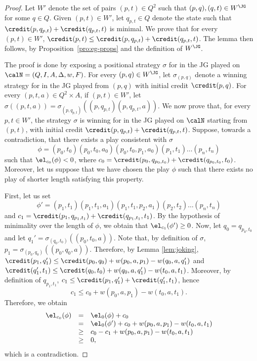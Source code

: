\documentclass[a4paper]{article}
\begin{document}
\begin{proof} 
	Let $W'$ denote the set of pairs $(p,t) \in Q^2$ such that $(p,q),(q,t)
	\in W^{\JG}$ for some $q \in Q$.  Given $(p,t) \in W'$, let $q_{p,t} \in
	Q$ denote the state such that $\credit(p,q_{p,t}) + \credit(q_{p,t},t)$
	is minimal.  We prove that for every $(p,t) \in W'$, $\credit(p,t) \leq
	\credit(p,q_{p,t}) + \credit(q_{p,t},t)$.  The lemma then follows, by
	Proposition~\ref{pro:eg-props} and the definition of $W^{\JG}$.
	
	The proof is done by exposing a positional strategy $\sigma$ for \eve in
	the JG played on $\calN = (Q,I,A,\Delta,w,F)$.
	For every $(p,q) \in W^{\JG}$, let
	$\sigma_{(p,q)}$ denote a winning strategy for \eve in the JG played
	from $(p,q)$ with initial credit $\credit(p,q)$.  For every $(p,t,a) \in
	Q^2 \times A$, if $(p,t) \in W'$, let $\sigma((p,t,a)) =
	\sigma_{(p,q_{p,t})}((p,q_{p,t})(p,q_{p,t},a))$.  We now prove that, for
	every $p,t \in W'$, the strategy $\sigma$ is winning for \eve in the JG
	played on $\calN$ starting from $(p,t)$, with initial credit
	$\credit(p,q_{p,t}) + \credit(q_{p,t},t)$.  Suppose, towards a
	contradiction, that there exists a play consistent with $\sigma$
	\[
		\phi = (p_0, t_0) (p_0, t_0, a_0) (p_0, t_0,p_1, a_0)(p_1,t_1)
		\dots (p_n,t_n)
	\]
	such that $\el_{c_0}(\phi) < 0$, where $c_0 = \credit(p_0,q_{p_0,t_0}) +
	\credit(q_{p_0,t_0},t_0)$.  Moreover, let us suppose that we have chosen
	the play $\phi$ such that there exists no play of shorter length
	satisfying this property.
	
	First, let us set
	\[
		\phi' = (p_1, t_1) (p_1, t_1, a_1) (p_1, t_1,p_2, a_1)(p_2,t_2) \dots
		(p_n,t_n)
	\]
	and $c_1 = \credit(p_1,q_{p_1,t_1}) + \credit(q_{p_1,t_1},t_1)$.  By the
	hypothesis of minimality over the length of $\phi$, we obtain that
	$\el_{c_1}(\phi') \geq 0$.  Now, let $q_0 = q_{p_0,t_0}$ and let $q_1' =
	\sigma_{(q_0,t_0)}((p_0,t_0,a))$.  Note that, by definition of $\sigma$,
	$p_1 = \sigma_{(p_0,q_0)}((p_0,q_0,a))$.  Therefore, by Lemma
	\ref{lem:joking}, $\credit(p_1,q'_1) \leq \credit(p_0,q_0) +
	w(p_0,a,p_1) - w(q_0,a,q'_1)$ and $\credit(q'_1,t_1) \leq
	\credit(q_0,t_0) + w(q_0,a,q'_1) - w(t_0,a,t_1)$.  Moreover, by
	definition of $q_{p_1,t_1}$, $c_1 \leq \credit(p_1,q'_1) +
	\credit(q'_1,t_1)$, hence
	\[
		c_1 \leq c_0 + w(p_0,a,p_1) - w(t_0,a,t_1).
	\]
	Therefore, we obtain
	\[
		\begin{array}{lll}
		\el_{c_0}(\phi) & = & \el_{0}(\phi) + c_0\\
		& = & \el_{0}(\phi') + c_0 + w(p_0,a,p_1) - w(t_0,a,t_1)\\
		& \geq & c_0 - c_1 + w(p_0,a,p_1) - w(t_0,a,t_1)\\
		& \geq & 0,
		\end{array}
	\]
	which is a contradiction.
\end{proof}
\end{document}

